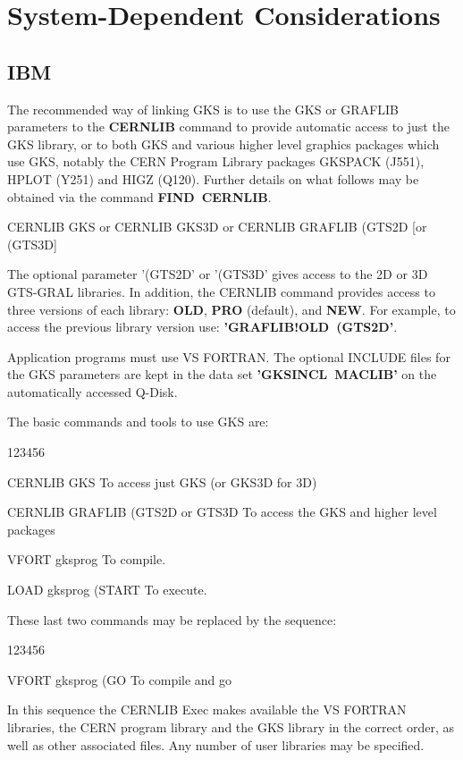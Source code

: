 \section{System-Dependent Considerations}
\subsection{IBM}
 
The recommended way of linking GKS is to use the GKS or GRAFLIB parameters
to the {\bf CERNLIB} command to provide automatic access to just
the GKS library, or to both GKS and various higher level graphics
packages which use GKS, notably the CERN Program Library packages
GKSPACK (J551), HPLOT (Y251) and HIGZ (Q120).
Further details on what follows may be obtained via the command
{\bf FIND~CERNLIB}.
\begin{XMP}
CERNLIB GKS
        or
CERNLIB GKS3D
        or
CERNLIB GRAFLIB (GTS2D       [or (GTS3D]
\end{XMP}
The optional parameter '(GTS2D' or '(GTS3D' gives access to the 2D or 3D
GTS-GRAL libraries. In addition, the CERNLIB command
provides access to three versions of each library: {\bf OLD},
{\bf PRO} (default), and {\bf NEW}.
For example, to access the previous library version use:
{\bf 'GRAFLIB!OLD~(GTS2D'}.
 
Application programs must use VS FORTRAN.
The optional INCLUDE files for the GKS parameters are kept in the data set
{\bf 'GKSINCL~MACLIB'} on the automatically accessed Q-Disk.
 
The basic commands and tools to use GKS are:
\begin{DLtt}{123456}
\item[CERNLIB GKS]
To access just GKS (or GKS3D for 3D)
\item[CERNLIB GRAFLIB (GTS2D or GTS3D]
To access the GKS and higher level packages
\item[VFORT gksprog]To compile.
\item[LOAD gksprog (START]To execute.
\end{DLtt}
These last two commands may be replaced by the sequence:
\begin{DLtt}{123456}
\item[VFORT gksprog (GO]To compile and go
\end{DLtt}
In this sequence the CERNLIB Exec makes available the VS FORTRAN libraries,
the CERN program library and the GKS library in the correct
order, as well as other associated files.
Any number of user libraries may be specified.
 
